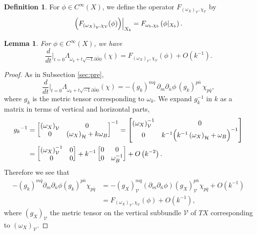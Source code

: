 \documentclass{amsart}
\numberwithin{equation}{section}
\theoremstyle{plain}
\newtheorem{lemma}[equation]{Lemma}
\theoremstyle{definition}
\newtheorem{definition}[equation]{Definition}
\theoremstyle{remark}
\begin{document}
\begin{definition}
For $\phi \in C^\infty(X)$, we define the operator $F_{ \left( \omega_X \right)_\mathcal{V}, \chi_\mathcal{V}}$ by 
$$\Bigl( F_{ \left( \omega_X \right)_\mathcal{V}, \chi_\mathcal{V}} (\phi) \Bigr) \Big\vert_{X_b} = F_{ \omega_b, \chi_b} \left( \phi\vert_{X_b} \right).$$
\end{definition}

\begin{lemma}\label{lem:k^-1}
 For $\phi \in C^\infty(X)$, we have
$$\frac{d}{dt}\Big|_{t = 0} \Lambda_{\omega_k + t \sqrt{-1} \partial \bar{\partial} \phi } (\chi) 
= F_{ \left( \omega_X \right)_\mathcal{V}, \chi_\mathcal{V}} \left(\phi \right) + O \left( k^{-1} \right).$$
\end{lemma}

\begin{proof}
As in Subsection \ref{sec:pre}, 
$$\frac{d}{dt}\Big|_{t = 0} \Lambda_{\omega_k + t \sqrt{-1} \partial \bar{\partial} \phi } (\chi) 
= {- {\left(g_k \right)^{m \bar{q}}} \, {\partial_m \partial_{\bar{n}} \phi} \, {\left( g_k \right)^{p \bar{n}}} \, {\chi_{p \bar{q}}}},$$
where $g_k$ is the metric tensor corresponding to $\omega_k$. 
We expand $g_k^{-1}$ in $k$ as a matrix in terms of vertical and horizontal parts, 
\begin{align*}
 {g_k}^{-1} &= \begin{bmatrix}
    \left( \omega_X \right)_\mathcal{V} & 0 \\
     0 & \left( \omega_X \right)_\mathcal{H} + k \omega_B   
\end{bmatrix}^{-1}
= \begin{bmatrix}
  \left( \omega_X \right)_\mathcal{V}^{-1} & 0 \\
  0 & k^{-1} \Bigl( k^{-1} \left( \omega_X \right)_\mathcal{H} + \omega_B \Bigr)^{-1}
\end{bmatrix} \\
&= \begin{bmatrix}
   \left( \omega_X \right)_\mathcal{V}^{-1} & 0 \\
   0 & 0
\end{bmatrix} 
+k^{-1} 
\begin{bmatrix}
0  & 0 \\ 0 & \omega_B^{-1}
\end{bmatrix} + O \left( k^{-2} \right).
\end{align*}
Therefore we see that 
\begin{align*}
{- {\left(g_k \right)^{m \bar{q}}}{\partial_m \partial_{\bar{n}} \phi} {\left( g_k \right)^{p \bar{n}}} {\chi_{p \bar{q}}}} 
&= {- {\left(g_X \right)_\mathcal{V}^{m \bar{q}}}\left( {\partial_m \partial_{\bar{n}} \phi}\right) {\left( g_X \right)_\mathcal{V}^{p \bar{n}}} {\chi_{p \bar{q}}}} + O \left(k^{-1} \right) \\ 
&= F_{ \left( \omega_X \right)_\mathcal{V}, \chi_\mathcal{V}} \left(\phi \right) + O \left( k^{-1} \right),
\end{align*}
where $\left(g_X \right)_\mathcal{V}$ the metric tensor on the vertical subbundle $\mathcal{V}$ of $TX$ corresponding to $\left(\omega_X\right)_\mathcal{V}$.
\end{proof}
\end{document}
